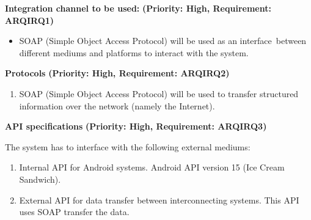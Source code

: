 \documentclass[12pt]{article}
\begin{document}
			\vspace{0.2in}


		\begin{flushleft}
				\textbf{Integration channel to be used:}
				\newline\textbf{(Priority: High, Requirement: ARQIRQ1)} 
		\end{flushleft}
			
			\vspace{0.05in} 
			\begin{itemize} 
				\item SOAP (Simple Object Access Protocol) will be used as an interface\
				 between different mediums and platforms to interact with the system.
			\end{itemize} 
			
			\vspace{0.15in}




		\begin{flushleft}
				\textbf{Protocols}
				\newline\textbf{(Priority: High, Requirement: ARQIRQ2)} 
		\end{flushleft}
			
			\vspace{0.05in} 
			
			\begin{enumerate}
				\item SOAP (Simple Object Access Protocol) will be used to transfer 
				structured information over the network (namely the Internet). 
			\end{enumerate}	
			
			\vspace{0.15in}
			
		
\begin{flushleft}
				\textbf{API specifications}
				\newline\textbf{(Priority: High, Requirement: ARQIRQ3)}
\end{flushleft}		
		\vspace{0.05in} 
		
		The system has to interface with the following external mediums:
	\begin{enumerate}
		\item Internal API for Android systems. Android API version 15 (Ice Cream Sandwich). 
		\item External API for data transfer between interconnecting systems. This API uses SOAP 				transfer the data.
	\end{enumerate}
	\vspace{0.05in} 
	
\end{document}
